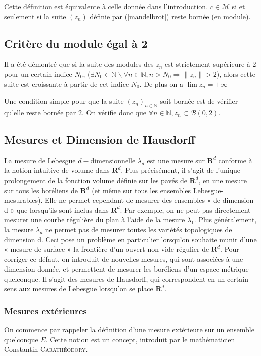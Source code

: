 \documentclass[12pt,a4paper]{article}
\theoremstyle{plain}
\theoremstyle{plain}
\theoremstyle{definition}
\theoremstyle{remark}
\begin{document}
Cette définition est équivalente à celle donnée dans l'introduction. $c \in \mathcal{M}$ si et seulement si la suite $(z_n)$ définie par (\ref{mandelbrot}) reste bornée (en module).

	\subsection{Critère du module égal à 2}
Il a été démontré que si la suite des modules des $z_n$ est strictement supérieure à $2$ pour un certain indice $N_0$,
($\exists N_0 \in \mathbb{N} \backslash \forall n \in \mathbb{N},{} n>N_0 \Longrightarrow \|z_n\|>2$), alors cette suite est croissante à partir de cet indice $N_0$. De plus on a $\lim z_n = +\infty$

Une condition simple pour que la suite $(z_n)_{n \in \mathbb{N}}$ soit bornée est de vérifier qu'elle reste bornée par $2$. On vérifie donc que $\forall n \in \mathbb{N}, z_n \subset \mathcal{B}(0,2)$.

	\subsection{Mesures et Dimension de Hausdorff}
La mesure de Lebesgue $d-$dimensionnelle $\lambda_d$ est une mesure sur $\mathbf{R}^d$ conforme à la notion intuitive de volume dans $\mathbf{R}^d$. Plus précisément, il s’agit de l’unique prolongement de la fonction volume définie sur les pavés de $\mathbf{R}^d$, en une mesure sur tous les boréliens de $\mathbf{R}^d$ (et même sur tous les ensembles Lebesgue-mesurables). Elle ne permet cependant de mesurer des ensembles « de dimension d » que lorsqu’ils sont inclus dans $\mathbf{R}^d$. Par exemple, on ne peut pas directement mesurer une courbe régulière du plan à l’aide de la mesure $\lambda_1$. Plus généralement, la mesure $\lambda_d$ ne permet pas de mesurer toutes les variétés topologiques de dimension d. Ceci pose un problème en particulier lorsqu’on souhaite munir d’une « mesure de surface » la
frontière d’un ouvert non vide régulier de $\mathbf{R}^d$.
Pour corriger ce défaut, on introduit de nouvelles mesures, qui sont associées à une dimension donnée, et permettent de mesurer les boréliens d’un espace métrique quelconque. Il s’agit des mesures de Hausdorff, qui correspondent en un certain 
sens aux mesures de Lebesgue lorsqu’on se place $\mathbf{R}^d$.
	\subsubsection{Mesures extérieures}
On commence par rappeler la définition d'une mesure extérieure sur un ensemble quelconque $E$. Cette notion est un concept, introduit par le mathématicien Constantin \textsc{Carathéodory}. 
\end{document}
